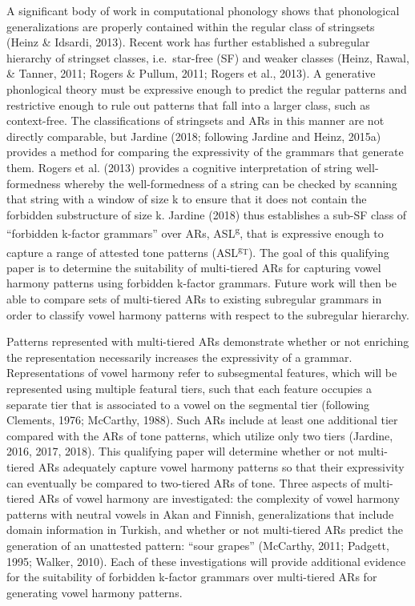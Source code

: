 \documentclass[,doc,floatsintext]{apa6}
\theoremstyle{definition}
\theoremstyle{definition}
\theoremstyle{definition}
\theoremstyle{remark}
\begin{document}
A significant body of work in computational phonology shows that
phonological generalizations are properly contained within the regular
class of stringsets (Heinz \& Idsardi, 2013). Recent work has further
established a subregular hierarchy of stringset classes, i.e.~star-free
(SF) and weaker classes (Heinz, Rawal, \& Tanner, 2011; Rogers \&
Pullum, 2011; Rogers et al., 2013). A generative phonlogical theory must
be expressive enough to predict the regular patterns and restrictive
enough to rule out patterns that fall into a larger class, such as
context-free. The classifications of stringsets and ARs in this manner
are not directly comparable, but Jardine (2018; following Jardine and
Heinz, 2015a) provides a method for comparing the expressivity of the
grammars that generate them. Rogers et al. (2013) provides a cognitive
interpretation of string well-formedness whereby the well-formedness of
a string can be checked by scanning that string with a window of size k
to ensure that it does not contain the forbidden substructure of size k.
Jardine (2018) thus establishes a sub-SF class of \enquote{forbidden
k-factor grammars} over ARs, ASL\textsuperscript{g}, that is expressive
enough to capture a range of attested tone patterns
(ASL\textsuperscript{g\textsubscript{T}}). The goal of this qualifying
paper is to determine the suitability of multi-tiered ARs for capturing
vowel harmony patterns using forbidden k-factor grammars. Future work
will then be able to compare sets of multi-tiered ARs to existing
subregular grammars in order to classify vowel harmony patterns with
respect to the subregular hierarchy.

Patterns represented with multi-tiered ARs demonstrate whether or not
enriching the representation necessarily increases the expressivity of a
grammar. Representations of vowel harmony refer to subsegmental
features, which will be represented using multiple featural tiers, such
that each feature occupies a separate tier that is associated to a vowel
on the segmental tier (following Clements, 1976; McCarthy, 1988). Such
ARs include at least one additional tier compared with the ARs of tone
patterns, which utilize only two tiers (Jardine, 2016, 2017, 2018). This
qualifying paper will determine whether or not multi-tiered ARs
adequately capture vowel harmony patterns so that their expressivity can
eventually be compared to two-tiered ARs of tone. Three aspects of
multi-tiered ARs of vowel harmony are investigated: the complexity of
vowel harmony patterns with neutral vowels in Akan and Finnish,
generalizations that include domain information in Turkish, and whether
or not multi-tiered ARs predict the generation of an unattested pattern:
\enquote{sour grapes} (McCarthy, 2011; Padgett, 1995; Walker, 2010).
Each of these investigations will provide additional evidence for the
suitability of forbidden k-factor grammars over multi-tiered ARs for
generating vowel harmony patterns.
\end{document}
